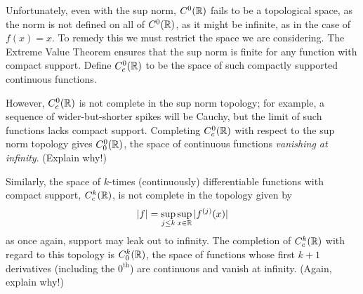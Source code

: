     Unfortunately, even with the sup norm, $C^0(\mathbb{R})$ fails to be a topological space, as the norm is not defined on all of $C^0(\mathbb{R})$, as it might be infinite, as in the case of $f(x)=x$.
    To remedy this we must restrict the space we are considering.
    The Extreme Value Theorem ensures that the sup norm is finite for any function with compact support.
    Define $C^0_c(\mathbb{R})$ to be the space of such compactly supported continuous functions.

    However, $C^0_c(\mathbb{R})$ is not complete in the sup norm topology; for example, a sequence of wider-but-shorter spikes will be Cauchy, but the limit of such functions lacks compact support. %
    Completing $C^0_c(\mathbb{R})$ with respect to the sup norm topology gives $C_0^0(\mathbb{R})$, the space of continuous functions \emph{vanishing at infinity}. (Explain why!) %

    Similarly, the space of $k$-times (continuously) differentiable functions with compact support, $C_c^k(\mathbb{R})$, is not complete in the topology given by
    \begin{equation*}
      |f| = \sup_{j\le k} \sup_{x\in\mathbb{R}} |f^{(j)}(x)|
    \end{equation*}
    as once again, support may leak out to infinity.
    The completion of $C_c^k(\mathbb{R})$ with regard to this topology is $C_0^k(\mathbb{R})$, the space of functions whose first $k+1$ derivatives (including the $0^\text{th}$) are continuous and vanish at infinity. (Again, explain why!) %



%



